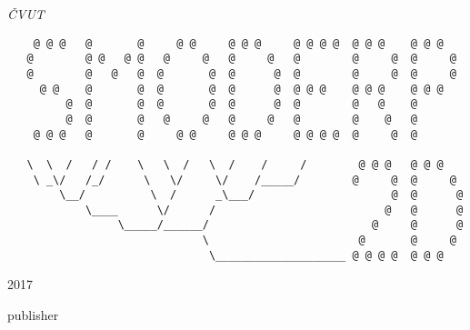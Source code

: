 \begin{titlepage}
	\vspace{0.5\baselineskip} %
	
	\textit{ČVUT} %
	
	\vfill %
	
	
	
	
	\begin{verbatim}
    @ @ @   @       @     @ @     @ @ @     @ @ @ @  @ @ @    @ @ @
   @        @ @   @ @   @     @   @     @   @        @     @  @     @
   @        @   @   @  @       @  @      @  @        @     @  @     @
     @ @    @       @  @       @  @      @  @ @ @    @ @ @    @ @ @
         @  @       @  @       @  @      @  @        @   @    @
         @  @       @   @     @   @     @   @        @    @   @
    @ @ @   @       @     @ @     @ @ @     @ @ @ @  @     @  @

   \  \  /   / /    \   \  /   \  /    /     /        @ @ @   @ @ @
    \ _\/   /_/      \   \/     \/    /_____/        @     @  @     @
        \__/          \  /      _\___/                     @  @      @
            \____      \/      /                          @   @      @
                 \_____/______/                         @     @      @
                              \                       @       @     @
                               \____________________ @ @ @ @  @ @ @
 \end{verbatim}
 
 
 
        
	
	\vspace{0.3\baselineskip} %
	
	2017 %
	
	{\large publisher} %

\end{titlepage}



